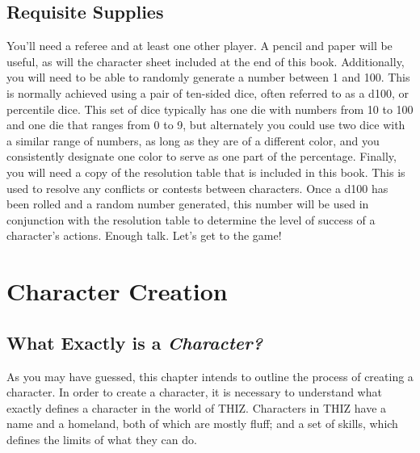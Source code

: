 \documentclass[oneside]{book}
\begin{document}
\section*{Requisite Supplies}

You'll need a referee and at least one other player. A pencil and paper will be useful, as will the character sheet included at the end of this book. Additionally, you will need to be able to randomly generate a number between 1 and 100. This is normally achieved using a pair of ten-sided dice, often referred to as a d100, or percentile dice.  This set of dice typically has one die with numbers from 10 to 100 and one die that ranges from 0 to 9, but alternately you could use two dice with a similar range of numbers, as long as they are of a different color, and you consistently designate one color to serve as one part of the percentage. Finally, you will need a copy of the resolution table that is included in this book. This is used to resolve any conflicts or contests between characters. Once a d100 has been rolled and a random number generated, this number will be used in conjunction with the resolution table to determine the level of success of a character's actions. Enough talk. Let's get to the game!

\chapter{Character Creation}

\section{What Exactly is a \emph{Character?}}
As you may have guessed, this chapter intends to outline the process of creating a character. In order to create a character, it is necessary to understand what exactly defines a character in the world of THIZ. Characters in THIZ have a name and a homeland, both of which are mostly fluff; and a set of skills, which defines the limits of what they can do.
\end{document}
